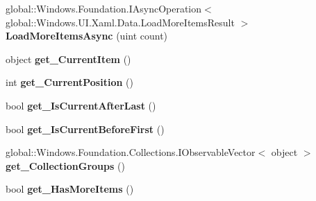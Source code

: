 \begin{DoxyCompactItemize}
\mbox{\label{interface_windows_1_1_u_i_1_1_xaml_1_1_data_1_1_i_collection_view_afff3ada80e1e28eecc211ceea07432e6}} 
global\+::\+Windows.\+Foundation.\+I\+Async\+Operation$<$ global\+::\+Windows.\+U\+I.\+Xaml.\+Data.\+Load\+More\+Items\+Result $>$ {\bfseries Load\+More\+Items\+Async} (uint count)
\item 
\mbox{\label{interface_windows_1_1_u_i_1_1_xaml_1_1_data_1_1_i_collection_view_a43f61960edb4358decd76d9a67795056}} 
object {\bfseries get\+\_\+\+Current\+Item} ()
\item 
\mbox{\label{interface_windows_1_1_u_i_1_1_xaml_1_1_data_1_1_i_collection_view_a02161c84bc29710943679eac292ac035}} 
int {\bfseries get\+\_\+\+Current\+Position} ()
\item 
\mbox{\label{interface_windows_1_1_u_i_1_1_xaml_1_1_data_1_1_i_collection_view_a478e1eca1b915f6c0741a4c1401176a0}} 
bool {\bfseries get\+\_\+\+Is\+Current\+After\+Last} ()
\item 
\mbox{\label{interface_windows_1_1_u_i_1_1_xaml_1_1_data_1_1_i_collection_view_a6cb419f2cf548fb6ecdd5ece10c84b37}} 
bool {\bfseries get\+\_\+\+Is\+Current\+Before\+First} ()
\item 
\mbox{\label{interface_windows_1_1_u_i_1_1_xaml_1_1_data_1_1_i_collection_view_ad162ea2427cc1f950600c9a28bc40a2f}} 
global\+::\+Windows.\+Foundation.\+Collections.\+I\+Observable\+Vector$<$ object $>$ {\bfseries get\+\_\+\+Collection\+Groups} ()
\item 
\mbox{\label{interface_windows_1_1_u_i_1_1_xaml_1_1_data_1_1_i_collection_view_aec8115295fb03164ca68a5a9f2651054}} 
bool {\bfseries get\+\_\+\+Has\+More\+Items} ()
\item 
\mbox{\label{interface_windows_1_1_u_i_1_1_xaml_1_1_data_1_1_i_collection_view_a617dea4435e2a2a52dc87193df28e8dc}} 

\end{DoxyCompactItemize}
